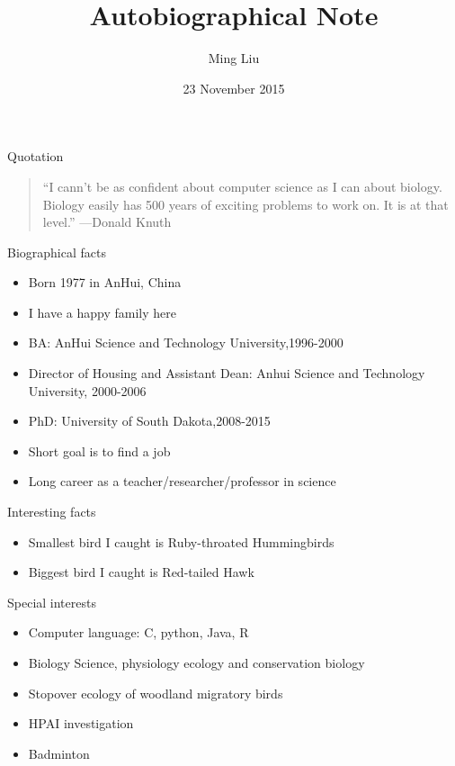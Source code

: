 \documentclass{beamer}
\title{Autobiographical Note}
\author{Ming Liu}
\institute{Cornell College}
\date{23 November 2015}
\begin{document}
\begin{frame}
  \titlepage
\end{frame}

\begin{frame}{Quotation}
\begin{quotation}
\noindent
``I cann't be as confident about computer science as I can about biology. Biology easily has 500 years of exciting problems to work on. It is at that level.''
  \flushright
  ---Donald Knuth
  \end{quotation}
\end{frame}

\begin{frame}{Biographical facts}
\begin{itemize}
  \item Born 1977 in AnHui, China
  \item I have a happy family here  
  \item BA: AnHui Science and Technology University,1996-2000
\item Director of Housing and Assistant Dean: Anhui Science and Technology University, 2000-2006  
\item PhD: University of South Dakota,2008-2015
  \item Short goal is to find a job
  \item Long career as a teacher/researcher/professor in science
  \end{itemize}
\end{frame}

\begin{frame}{Interesting facts}
\begin{itemize}
  \item Smallest bird I caught is Ruby-throated Hummingbirds
  \item Biggest bird I caught is Red-tailed Hawk
   \end{itemize}
 \end{frame}
\begin{frame}{Special interests}
\begin{itemize}
  \item Computer language: C, python, Java, R
  \item Biology Science, physiology ecology and conservation biology 
  \item Stopover ecology of woodland migratory birds
\item HPAI investigation  
\item Badminton
\end{itemize}
\end{frame}
\end{document}
